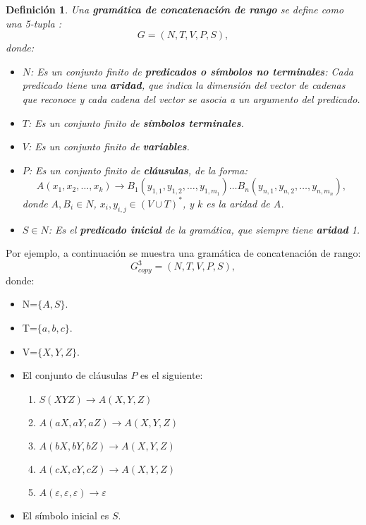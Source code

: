\documentclass[12pt]{article}
\newtheorem{definition}{Definición}
\begin{document}
\begin{definition}
    Una \textbf{gramática de concatenación de rango} se define como una 5-tupla
    :
    \[
        G = (N, T, V, P, S),
    \]
    donde:
    
    \begin{itemize}
        \item $N$: Es un conjunto finito de \textbf{predicados o símbolos no terminales}: Cada predicado tiene una \textbf{aridad}, que indica la dimensión del vector de cadenas que reconoce y cada cadena del vector se asocia a un argumento del predicado.
        \item $T$: Es un conjunto finito de \textbf{símbolos terminales}.
        \item $V$: Es un conjunto finito de \textbf{variables}.
        \item $P$: Es un conjunto finito de \textbf{cláusulas}, de la forma:
              \[
                  A(x_1, x_2, \ldots, x_k) \to B_1(y_{1,1}, y_{1,2}, \ldots, y_{1,m_1}) \ldots B_n(y_{n,1}, y_{n,2}, \ldots, y_{n,m_n}),
              \]
              donde $A, B_i \in N$, $x_i, y_{i,j} \in (V \cup T)^*$, y $k$ es la aridad de $A$.
        \item $S \in N$: Es el \textbf{predicado inicial} de la gramática, que siempre tiene \textbf{aridad} 1.
    \end{itemize}
\end{definition}


Por ejemplo, a continuación se muestra una gramática de concatenación de rango:
\label{g_3copy}
\[
    G^3_{copy} = (N, T, V, P, S),
\]
donde:

\begin{itemize}
    \item  N=$\{A,S\}$.
    \item T=$\{a,b,c\}$.
    \item V=$\{X,Y,Z\}$.
    \item El conjunto de cláusulas $P$ es el siguiente:
          \begin{enumerate}
              \item $S(XYZ)\to A(X,Y,Z)$
              \item $A(aX,aY,aZ)\to A(X,Y,Z)$
              \item $A(bX,bY,bZ)\to A(X,Y,Z)$
              \item $A(cX,cY,cZ)\to A(X,Y,Z)$
              \item $A(\varepsilon,\varepsilon,\varepsilon)\to \varepsilon$
          \end{enumerate}
    \item El símbolo inicial es $S$.
\end{itemize}
\end{document}
